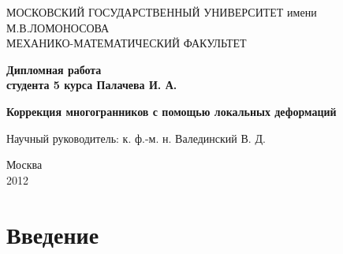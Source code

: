 \documentclass[a4paper,12pt, titlepage]{article}
\begin{document}
\begin{titlepage}
\begin{center}
МОСКОВСКИЙ ГОСУДАРСТВЕННЫЙ УНИВЕРСИТЕТ имени \\
М.В.ЛОМОНОСОВА\\
МЕХАНИКО-МАТЕМАТИЧЕСКИЙ ФАКУЛЬТЕТ
\end{center}

\vspace{5cm}
\begin{center}
\large \bf{Дипломная работа}\\
студента 5 курса Палачева И. А.
\end{center}
\vspace{2cm}
\begin{center}
\LARGE \bf{Коррекция многогранников с помощью локальных деформаций}
\end{center}

\vspace{3cm}

\large
\begin{flushright}
Научный руководитель: к. ф.-м. н. Валединский В. Д.



\end{flushright}

\vspace{3cm}

\begin{center}
Москва\\2012
\end{center}

\end{titlepage}

\tableofcontents

\newpage
\section{Введение}
\end{document}
